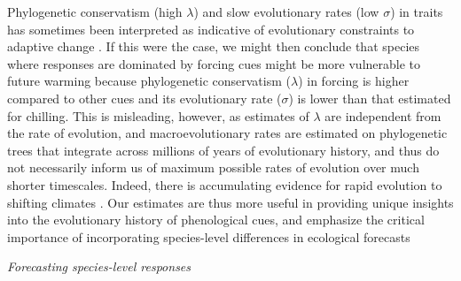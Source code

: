 \documentclass[11pt]{article}
\begin{document}
Phylogenetic conservatism (high $\lambda$) and slow evolutionary rates (low $\sigma$) in traits has sometimes been interpreted as indicative of evolutionary constraints to adaptive change \citep{wiens2010niche,bennett2021evolution}. If this were the case, we might then conclude that species where responses are dominated by forcing cues might be more vulnerable to future warming because phylogenetic conservatism ($\lambda$) in forcing is higher compared to other cues and its evolutionary rate ($\sigma$) is lower than that estimated for chilling. This is misleading, however, as estimates of $\lambda$ are independent from the rate of evolution, and macroevolutionary rates are estimated on phylogenetic trees that integrate across millions of years of evolutionary history, and thus do not necessarily inform us of maximum possible rates of evolution over much shorter timescales. Indeed, there is accumulating evidence for rapid evolution to shifting climates \citep{bradshaw2006,franks2014}. Our estimates are thus more useful in providing unique insights into the evolutionary history of phenological cues, and emphasize the critical importance of incorporating species-level differences in ecological forecasts


\emph{Forecasting species-level responses}
\end{document}
